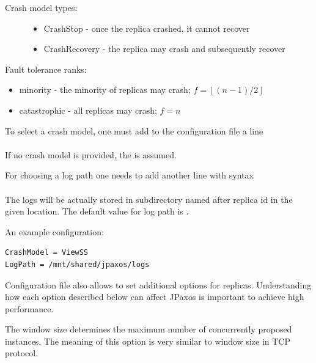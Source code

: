 \begin{description}
\item[{Crash model types:}] \leavevmode\begin{itemize}
\item {} 
CrashStop - once the replica crashed, it cannot recover

\item {} 
CrashRecovery - the replica may crash and subsequently recover

\end{itemize}

\end{description}

Fault tolerance ranks:
\begin{itemize}
\item {} 
minority - the minority of replicas may crash; $f = \left\lfloor (n-1)/2 \right\rfloor$

\item {} 
catastrophic - all replicas may crash; $f=n$

\end{itemize}

To select a crash model, one must add to the configuration file a line
\\\\ If no crash model is provided, the
 is assumed.

For choosing a log path one needs to add another line with syntax\\ \\ The logs will be actually stored in subdirectory named after replica
id in the given location. The default value for log path is .

An example configuration:

\begin{Verbatim}[commandchars=@\[\]]
CrashModel = ViewSS
LogPath = /mnt/shared/jpaxos/logs
\end{Verbatim}


\label{config:replica-options}
Configuration file also allows to set additional options for replicas.
Understanding how each option described below can affect JPaxos is important to
achieve high performance.


\label{config:window-size}
The window size determines the maximum number of concurrently proposed
instances. The meaning of this option is very similar to window size in TCP
protocol.

